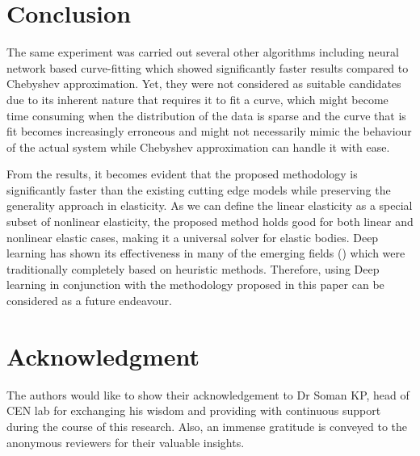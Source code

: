 \documentclass[conference]{IEEEtran}
\begin{document}
\section{Conclusion}
\label{conclusion}
The same experiment was carried out several other algorithms including neural network based curve-fitting which showed significantly faster results compared to Chebyshev approximation. Yet, they were not considered as suitable candidates due to its inherent nature that requires it to fit a curve, which might become time consuming when the distribution of the data is sparse and the curve that is fit becomes increasingly erroneous and might not necessarily mimic the behaviour of the actual system while Chebyshev approximation can handle it with ease.

From the results, it becomes evident that the proposed methodology is significantly faster than the existing cutting edge models while preserving the generality approach in elasticity. As we can define the linear elasticity as a special subset of nonlinear elasticity, the proposed method holds good for both linear and nonlinear elastic cases, making it a universal solver for elastic bodies. Deep learning \cite{34} has shown its effectiveness in many of the emerging fields (\cite{32,33}) which were traditionally completely based on heuristic methods. Therefore, using Deep learning in conjunction with the methodology proposed in this paper can be considered as a future endeavour.



\section*{Acknowledgment}
The authors would like to show their acknowledgement to Dr Soman KP, head of CEN lab for exchanging his wisdom and providing with continuous support during the course of this research. Also, an immense gratitude is conveyed to the anonymous reviewers for their valuable insights.
\end{document}
